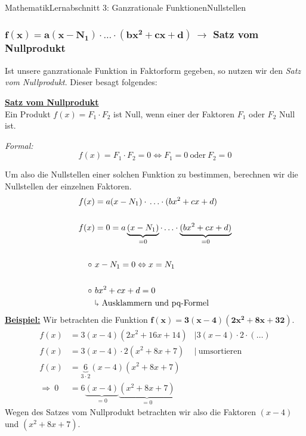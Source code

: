 \documentclass[11pt,twocolumn,oneside,openany,headings=optiontotoc,11pt,numbers=noenddot]{article}
\begin{document}
\begin{worksheet}{Mathematik}{Lernabschnitt 3: Ganzrationale Funktionen}{Nullstellen}
		\subsubsection{\(\mathbf{f(x) = a(x-N_1)\cdot{}\ldots\cdot{}(bx^2 + cx + d)}\ \rightarrow\) Satz vom Nullprodukt}
		Ist unsere ganzrationale Funktion in Faktorform gegeben, so nutzen wir den \textit{Satz vom Nullprodukt}. Dieser besagt folgendes:
		\begin{framed}
			\noindent
			\textbf{\underline{Satz vom Nullprodukt}}\\
			Ein Produkt \(f(x) = F_1\cdot{}F_2\) ist Null, wenn einer der Faktoren \(F_1\) oder \(F_2\) Null ist.\\
			\par\noindent
			\textit{Formal:} \[f(x) = F_1\cdot{}F_2 = 0 \Leftrightarrow F_1 = 0\ \text{oder}\ F_2 = 0\]
		\end{framed}
		Um also die Nullstellen einer solchen Funktion zu bestimmen, berechnen wir die Nullstellen der einzelnen Faktoren.
		\begin{align*}
			f(x) & = a(x-N_1)\cdot{}\ldots\cdot{}(bx^2 + cx + d)\\
			\\
			f(x) & = 0 = a\underbrace{(x-N_1)}_{=0}\cdot\ldots\cdot\underbrace{(bx^2+cx+d)}_{=0}\\
			\\
			\circ\ & x-N_1 = 0 \Leftrightarrow x = N_1\\
			\\
			\circ\ & bx^2 + cx + d = 0\\
			& 	\rotatebox[origin=c]{180}{$\Lsh$} \text{\ Ausklammern\ und\ pq-Formel}
		\end{align*}
		\textbf{\underline{Beispiel:}} Wir betrachten die Funktion \(\mathbf{f(x) = 3(x-4)(2x^2 + 8x + 32)}\).\\
		\begin{align*}
			f(x) & = 3(x-4)(2x^2 + 16x + 14) & |3(x-4)\cdot{}2\cdot(\ldots)\\
			f(x) & = 3(x-4)\cdot{}2(x^2 + 8x + 7) & |\ \text{umsortieren}\\
			f(x) & = \underbrace{6}_{3\cdot{}2}(x-4)(x^2+8x+7)\\
			\Rightarrow\ 0 & = 6\underbrace{(x-4)}_{=0}\underbrace{(x^2+8x+7)}_{=0}
		\end{align*}
		Wegen des Satzes vom Nullprodukt betrachten wir also die Faktoren \((x-4)\) und \((x^2+8x+7)\).\\
		\par\noindent
		\begin{tabularx}{0.48\textwidth}{Xl}

\end{tabularx}
\end{worksheet}
\end{document}
